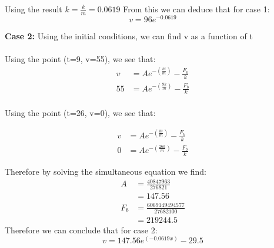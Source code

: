 Using the result $k=\frac{k}{m} = 0.0619$ From this we can deduce that for case 1:
\begin{equation}
    \boxed{v = 96e^{-0.0619}}
\end{equation}

\textbf{Case 2: } 
Using the initial conditions, we can find v as a function of t
\\ \\
Using the point (t=9, v=55), we see that:
\begin{align*}
    v &= Ae^{-(\frac{kt}{m})} - \frac{F_b}{k}
    \\ 55 &= Ae^{-(\frac{9k}{m})} - \frac{F_b}{k}
\end{align*}
\\
Using the point (t=26, v=0), we see that:

\begin{center}
\begin{align*}
    v &= Ae^{-(\frac{kt}{m})} - \frac{F_b}{k}
    \\ 0 &= Ae^{-(\frac{26k}{m})} - \frac{F_b}{k}
\end{align*}
\end{center}

Therefore by solving the simultaneous equation we find:
\begin{align*}
    A &= \frac{40847963}{276821}
    \\ &= 147.56
    \\ F_b &= \frac{6069149494577}{27682100}
    \\ &= 219244.5
\end{align*}
Therefore we can conclude that for case 2:
\begin{equation}
    \boxed{v = 147.56e^{(-0.0619x)} - 29.5}
\end{equation}

